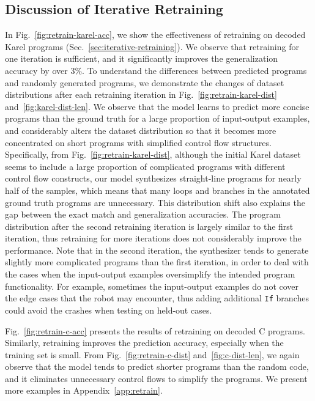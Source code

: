 \subsection{Discussion of Iterative Retraining}
In Fig.~\ref{fig:retrain-karel-acc}, we show the effectiveness of retraining on decoded Karel programs (Sec.~\ref{sec:iterative-retraining}). We observe that retraining for one iteration is sufficient, and it significantly improves the generalization accuracy by over $3\%$. To understand the differences between predicted programs and randomly generated programs, we demonstrate the changes of dataset distributions after each retraining iteration in Fig.~\ref{fig:retrain-karel-dist} and~\ref{fig:karel-dist-len}. We observe that the model learns to predict more concise programs than the ground truth for a large proportion of input-output examples, and considerably alters the dataset distribution so that it becomes more concentrated on short programs with simplified control flow structures. Specifically, from Fig.~\ref{fig:retrain-karel-dist}, although the initial Karel dataset seems to include a large proportion of complicated programs with different control flow constructs, our model synthesizes straight-line programs for nearly half of the samples, which means that many loops and branches in the annotated ground truth programs are unnecessary. This distribution shift also explains the gap between the exact match and generalization accuracies. The program distribution after the second retraining iteration is largely similar to the first iteration, thus retraining for more iterations does not considerably improve the performance. Note that in the second iteration, the synthesizer tends to generate slightly more complicated programs than the first iteration, in order to deal with the cases when the input-output examples oversimplify the intended program functionality. For example, sometimes the input-output examples do not cover the edge cases that the robot may encounter, thus adding additional \texttt{If} branches could avoid the crashes when testing on held-out cases.

Fig.~\ref{fig:retrain-c-acc} presents the results of retraining on decoded C programs. Similarly, retraining improves the prediction accuracy, especially when the training set is small. From Fig.~\ref{fig:retrain-c-dist} and~\ref{fig:c-dist-len}, we again observe that the model tends to predict shorter programs than the random code, and it eliminates unnecessary control flows to simplify the programs. We present more examples in Appendix~\ref{app:retrain}.




